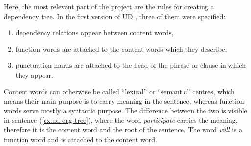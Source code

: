 Here, the most relevant part of the project are the rules for creating a dependency tree. In the first version of UD \citep{ud1}, three of them were specified: 
\begin{enumerate}
    \item dependency relations appear between content words,
    \item function words are attached to the content words which they describe,
    \item punctuation marks are attached to the head of the phrase or clause in which they appear.
\end{enumerate}
Content words can otherwise be called ``lexical'' or ``semantic'' centres, which means their main purpose is to carry meaning in the sentence, whereas function words serve mostly a syntactic purpose. The difference between the two is visible in sentence (\ref{ex:ud eng tree}), where the word \textsl{participate} carries the meaning, therefore it is the content word and the root of the sentence. The word \textsl{will} is a function word and is attached to the content word.

\vspace{3ex}
\hspace{-2.4em}
\vspace{1ex}


